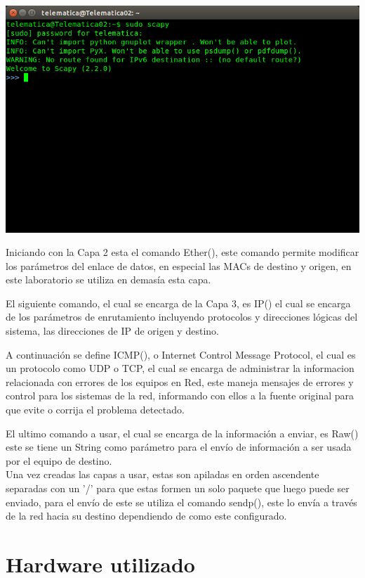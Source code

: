 \documentclass[spanish]{udpreport}
\begin{document}
\begin{center}
	\includegraphics[scale=.37]{imagenes/Scapy_Init.png}
\end{center}

Iniciando con la Capa 2 esta el comando Ether(), este comando permite modificar los parámetros del enlace de datos, en especial las MACs de destino y origen, en este laboratorio se utiliza en demasía esta capa.


El siguiente comando, el cual se encarga de la Capa 3, es IP() el cual se encarga de los parámetros de enrutamiento incluyendo protocolos y direcciones lógicas del sistema, las direcciones de IP de origen y destino.


A continuación se define ICMP(), o Internet Control Message Protocol, el cual es un protocolo como UDP o TCP, el cual se encarga de administrar la informacion relacionada con errores de los equipos en Red, este maneja mensajes de errores y control para los sistemas de la red, informando con ellos a la fuente original para que evite o corrija el problema detectado.

El ultimo comando a usar, el cual se encarga de la información a enviar, es Raw() este se tiene un String como parámetro para el envío de información a ser usada por el equipo de destino.
\\

Una vez creadas las capas a usar, estas son apiladas en orden ascendente separadas con un '/' para que estas formen un solo paquete que luego puede ser enviado, para el envío de este se utiliza el comando sendp(), este lo envía a través de la red hacia su destino dependiendo de como este configurado.


\section{Hardware utilizado}
\end{document}
